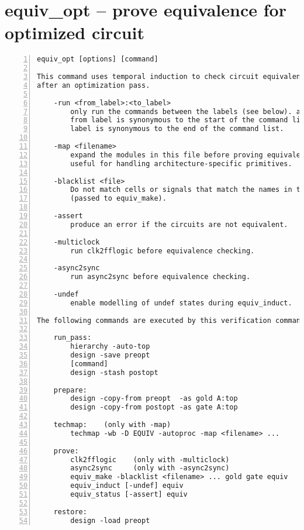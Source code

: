 \section{equiv\_opt -- prove equivalence for optimized circuit}
\label{cmd:equiv_opt}
\begin{lstlisting}[numbers=left,frame=single]
    equiv_opt [options] [command]

This command uses temporal induction to check circuit equivalence before and
after an optimization pass.

    -run <from_label>:<to_label>
        only run the commands between the labels (see below). an empty
        from label is synonymous to the start of the command list, and empty to
        label is synonymous to the end of the command list.

    -map <filename>
        expand the modules in this file before proving equivalence. this is
        useful for handling architecture-specific primitives.

    -blacklist <file>
        Do not match cells or signals that match the names in the file
        (passed to equiv_make).

    -assert
        produce an error if the circuits are not equivalent.

    -multiclock
        run clk2fflogic before equivalence checking.

    -async2sync
        run async2sync before equivalence checking.

    -undef
        enable modelling of undef states during equiv_induct.

The following commands are executed by this verification command:

    run_pass:
        hierarchy -auto-top
        design -save preopt
        [command]
        design -stash postopt

    prepare:
        design -copy-from preopt  -as gold A:top
        design -copy-from postopt -as gate A:top

    techmap:    (only with -map)
        techmap -wb -D EQUIV -autoproc -map <filename> ...

    prove:
        clk2fflogic    (only with -multiclock)
        async2sync     (only with -async2sync)
        equiv_make -blacklist <filename> ... gold gate equiv
        equiv_induct [-undef] equiv
        equiv_status [-assert] equiv

    restore:
        design -load preopt
\end{lstlisting}

